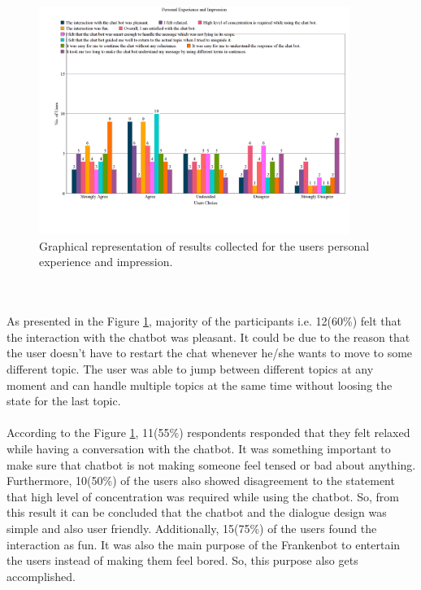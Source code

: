 \begin{figure}[!h]
    \centering
    \includegraphics[width=0.9\textwidth]{img/Personal_Experience_and_Impression.png}
    \caption{Graphical representation of results collected for the users personal experience and impression.}
    \label{fig:persExpandImp}
\end{figure}
\\~\\
As presented in the Figure \ref{fig:persExpandImp}, majority of the participants i.e. 12(60\%) felt that the interaction with the chatbot was pleasant. It could be due to the reason that the user doesn't have to restart the chat whenever he/she wants to move to some different topic. The user was able to jump between different topics at any moment and can handle multiple topics at the same time without loosing the state for the last topic. 
\\~\\
According to the Figure \ref{fig:persExpandImp}, 11(55\%) respondents responded that they felt relaxed while having a conversation with the chatbot. It was something important to make sure that chatbot is not making someone feel tensed or bad about anything. Furthermore, 10(50\%) of the users also showed disagreement to the statement that high level of concentration was required while using the chatbot. So, from this result it can be concluded that the chatbot and the dialogue design was simple and also user friendly. Additionally, 15(75\%) of the users found the interaction as fun. It was also the main purpose of the Frankenbot to entertain the users instead of making them feel bored. So, this purpose also gets accomplished. 
\\~\\
